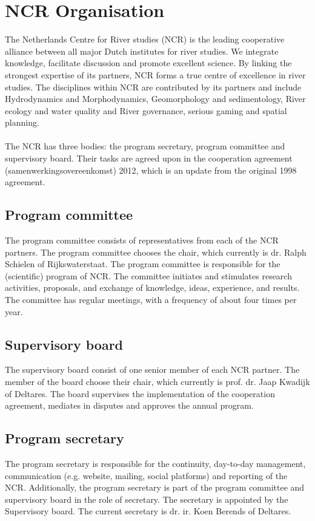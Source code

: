 \chapter{NCR Organisation}
The Netherlands Centre for River studies (NCR) is the leading cooperative alliance between all major Dutch institutes for river studies. We integrate knowledge,  facilitate discussion and promote excellent science. By linking the strongest expertise of its partners, NCR forms a true centre of excellence in river studies. The disciplines within NCR are contributed by its partners and include Hydrodynamics and Morphodynamics, Geomorphology and sedimentology, River ecology and water quality and River governance, serious gaming and spatial planning.\\
\\
The NCR has three bodies: the program secretary, program committee and supervisory board. Their tasks are agreed upon in the cooperation agreement (samenwerkingsovereenkomst) 2012, which is an update from the original 1998 agreement.\\
    
    \section{Program committee}
    The program committee consists of representatives from each of the NCR partners. The program committee chooses the chair, which currently is dr. Ralph Schielen of Rijkswaterstaat. The program committee is responsible for the (scientific) program of NCR. The committee initiates and stimulates research activities, proposals, and exchange of knowledge, ideas, experience, and results. The committee has regular meetings, with a frequency of about four times per year.\\ 
    
    \section{Supervisory board}
    The supervisory board consist of one senior member of each NCR partner. The member of the board choose their chair, which currently is prof. dr. Jaap Kwadijk of Deltares. The board supervises the implementation of the cooperation agreement, mediates in disputes and approves the annual program.\\ 
    
    \section{Program secretary}
    The program secretary is responsible for the continuity,  day-to-day management, communication (e.g. website, mailing, social platforms) and reporting of the NCR. Additionally, the program secretary is part of the program committee and supervisory board in the role of secretary. The secretary is appointed by the Supervisory board. The current secretary is dr. ir. Koen Berends of Deltares.

